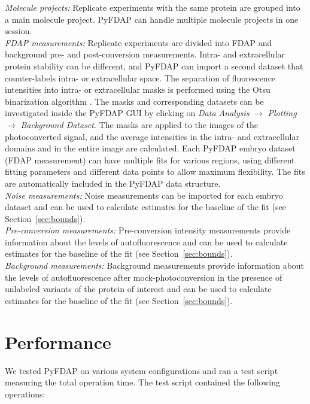 \documentclass[a4paper,11pt]{article}
\begin{document}
\noindent \textit{Molecule projects:} Replicate experiments with the same protein are grouped into a main molecule project. PyFDAP can handle multiple molecule projects in one session.  \\

\noindent \textit{FDAP measurements:} Replicate experiments are divided into FDAP and background pre- and post-conversion measurements. Intra- and extracellular protein stability can be different, and PyFDAP can import a second dataset that counter-labels intra- or extracellular space. The separation of fluorescence intensities into intra- or extracellular masks is performed using the Otsu binarization algorithm \citep{Otsu1979}. The masks and corresponding datasets can be investigated inside the PyFDAP GUI by clicking on \textit{Data Analysis} $\rightarrow$ \textit{Plotting} $\rightarrow$ \textit{Background Dataset}. The masks are applied to the images of the photoconverted signal, and the average intensities in the intra- and extracellular domains and in the entire image are calculated. Each PyFDAP embryo dataset (FDAP measurement) can have multiple fits for various regions, using different fitting parameters and different data points to allow maximum flexibility. The fits are automatically included in the PyFDAP data structure. \\

\noindent \textit{Noise measurements:} Noise measurements can be imported for each embryo dataset and can be used to calculate estimates for the baseline of the fit (see Section~\ref{sec:bounds}).\\

\noindent \textit{Pre-conversion measurements:} Pre-conversion intensity measurements provide information about the levels of autofluorescence and can be used to calculate estimates for the baseline of the fit (see Section~\ref{sec:bounds}).\\

\noindent \textit{Background measurements:} Background measurements provide information about the levels of autofluorescence after mock-photoconversion in the presence of unlabeled variants of the protein of interest and can be used to calculate estimates for the baseline of the fit (see Section~\ref{sec:bounds}).
 
\section{Performance}
\label{sec:performance}
We tested PyFDAP on various system configurations and ran a test script measuring the total operation time. The test script contained the following operations:
\end{document}
